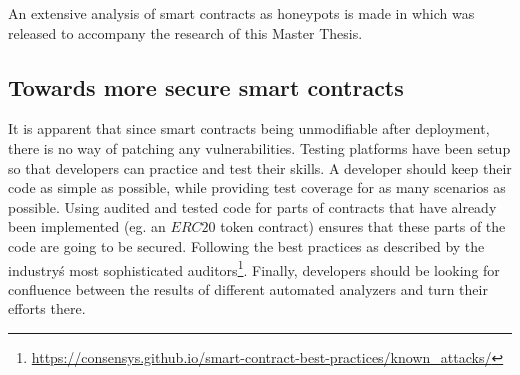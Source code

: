 An extensive analysis of smart contracts as honeypots is made in \cite{honeypots} which was released to accompany the research of this Master Thesis.

\subsection{Towards more secure smart contracts}
It is apparent that since smart contracts being unmodifiable after deployment, there is no way of patching any vulnerabilities. Testing platforms have been setup so that developers can practice and test their skills. A developer should keep their code as simple as possible, while providing test coverage for as many scenarios as possible. Using audited and tested code for parts of contracts that have already been implemented (eg. an $ERC20$ token contract) ensures that these parts of the code are going to be secured. Following the best practices as described by the industry\'s most sophisticated auditors\footnote{\url{https://consensys.github.io/smart-contract-best-practices/known_attacks/}}. Finally, developers should be looking for confluence between the results of different automated analyzers and turn their efforts there.
